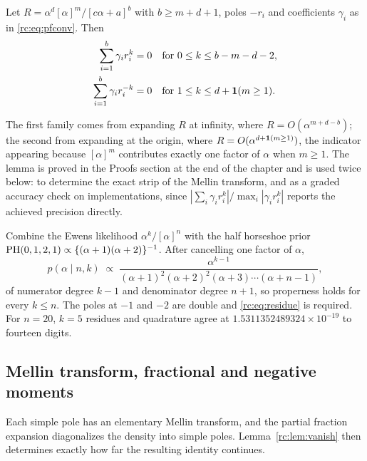 \begin{lemma}\label{rc:lem:vanish}
Let $R=\alpha^d[\alpha]^m/[c\alpha+a]^b$ with $b\ge m+d+1$, poles $-r_i$ and coefficients $\gamma_i$ as in \eqref{rc:eq:pfconv}. Then
\begin{align*}
\sum_{i=1}^b\gamma_i r_i^k&=0\quad\text{for }0\le k\le b-m-d-2,\\
\sum_{i=1}^b\gamma_i r_i^{-k}&=0\quad\text{for }1\le k\le d+\mathbf{1}(m\ge1).
\end{align*}
\end{lemma}

The first family comes from expanding $R$ at infinity, where $R=O(\alpha^{m+d-b})$; the second from expanding at the origin, where $R=O(\alpha^{d+\mathbf{1}(m\ge1)})$, the indicator appearing because $[\alpha]^m$ contributes exactly one factor of $\alpha$ when $m\ge1$. The lemma is proved in the Proofs section at the end of the chapter and is used twice below: to determine the exact strip of the Mellin transform, and as a graded accuracy check on implementations, since $|\sum_i\gamma_ir_i^k|/\max_i|\gamma_ir_i^k|$ reports the achieved precision directly.

\begin{example}\label{rc:ex:double}
Combine the Ewens likelihood $\alpha^k/[\alpha]^n$ with the half horseshoe prior $\mathrm{PH}(0,1,2,1)\propto\{(\alpha+1)(\alpha+2)\}^{-1}$. After cancelling one factor of $\alpha$,
\[
p(\alpha\mid n,k)\;\propto\;\frac{\alpha^{k-1}}{(\alpha+1)^2(\alpha+2)^2(\alpha+3)\cdots(\alpha+n-1)},
\]
of numerator degree $k-1$ and denominator degree $n+1$, so properness holds for every $k\le n$. The poles at $-1$ and $-2$ are double and \eqref{rc:eq:residue} is required. For $n=20$, $k=5$ residues and quadrature agree at $1.5311352489324\times10^{-19}$ to fourteen digits.
\end{example}

\subsection{Mellin transform, fractional and negative moments}

Each simple pole has an elementary Mellin transform, and the partial fraction expansion diagonalizes the density into simple poles. Lemma~\ref{rc:lem:vanish} then determines exactly how far the resulting identity continues.

